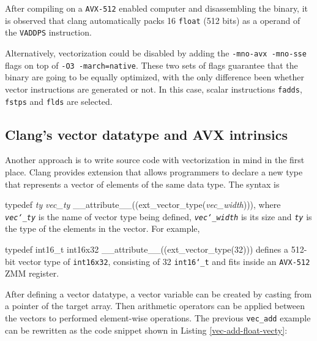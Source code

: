 \documentclass[logo,bsc,singlespacing,parskip]{infthesis}
\newcommand{\dtfloat}{\texttt{float}}
\newenvironment{VerbatimCompact}
  {\vspace*{-2.5mm}\VerbatimEnvironment
   \par\Verbatim}
  {\endVerbatim\vspace*{-2.4mm}}
\begin{document}
After compiling on a \texttt{AVX-512} enabled computer and disassembling the binary, it
is observed that clang automatically packs 16 \dtfloat{} (512 bits) as a
operand of the \texttt{VADDPS} instruction. 

Alternatively, vectorization could be disabled by adding the \texttt{-mno-avx
-mno-sse} flags on top of \texttt{-O3 -march=native}. These two sets of flags
guarantee that the binary are going to be equally optimized, with the only
difference been whether vector instructions are generated or not. In this case,
scalar instructions \texttt{fadds}, \texttt{fstps} and \texttt{flds} are
selected.


\subsection{Clang's vector datatype and AVX intrinsics}

Another approach is to write source code with vectorization in mind in the first
place. Clang provides extension that allows programmers to declare a new type
that represents a vector of elements of the same data type. The syntax is 
\begin{VerbatimCompact}[commandchars=\\\{\}]
typedef \textit{ty} \textit{vec_ty} __attribute__((ext_vector_type(\textit{vec_width}))), 
\end{VerbatimCompact}
where \textit{\texttt{vec\char`_ty}} is the name of vector type being defined,
\textit{\texttt{vec\char`_width}} is its size and \textit{\texttt{ty}} is the
type of the elements in the vector. For example, 
\begin{VerbatimCompact}[commandchars=\\\{\}]
typedef int16_t int16x32 __attribute__((ext_vector_type(32)))
\end{VerbatimCompact}
defines a 512-bit vector type of \texttt{int16x32}, consisting of 32
\texttt{int16\char`_t} and fits inside an \texttt{AVX-512} ZMM register. 

After defining a vector datatype, a vector variable can be created by casting
from a pointer of the target array. Then arithmetic operators can be applied
between the vectors to performed element-wise operations. The previous
\texttt{vec\_add} example can be rewritten as the code snippet shown in Listing
\ref{vec-add-float-vecty}:
\end{document}
